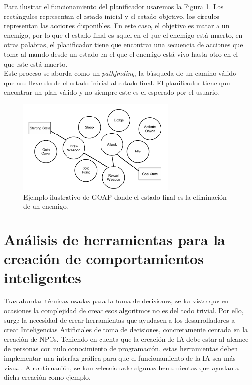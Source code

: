 \begin{itemize}
Para ilustrar el funcionamiento del planificador usaremos la Figura \ref{fig:GOAP_Planificador}.
Los rectángulos representan el estado inicial y el estado objetivo, los círculos representan las acciones disponibles.
En este caso, el objetivo es matar a un enemigo, por lo que el estado final es aquel en el que el enemigo está muerto, en otras palabras, el planificador tiene que encontrar una secuencia de acciones que tome al mundo desde un estado en el que el enemigo está vivo hasta otro en el que este está muerto.\\
Este proceso se aborda como un \textit{pathfinding}, la búsqueda de un camino válido que nos lleve desde el estado inicial al estado final. El planificador tiene que encontrar un plan válido y no siempre este es el esperado por el usuario. 


\begin{figure}[t]
	\centering
	\includegraphics[width = 0.7\textwidth]{Imagenes/GOAP_Planificador.png}
	\caption{Ejemplo ilustrativo de GOAP donde el estado final es la eliminación de un enemigo.}
	\label{fig:GOAP_Planificador}
\end{figure}
	
	
\end{itemize}

\section{Análisis de herramientas para la creación de comportamientos inteligentes}

Tras abordar técnicas usadas para la toma de decisiones, se ha visto que en ocasiones la complejidad de crear esos algoritmos no es del todo trivial. Por ello, surge la necesidad de crear herramientas que ayudasen a los desarrolladores a crear Inteligencias Artificiales de toma de decisiones, concretamente cenrada en la creación de NPCs. Teniendo en cuenta que la creación de IA debe estar al alcance de personas con nulo conocimiento de programación, estas herramientas deben implementar una interfaz gráfica para que el funcionamiento de la IA sea más visual.
A continuación, se han seleccionado algunas herramientas que ayudan a dicha creación como ejemplo.\\

